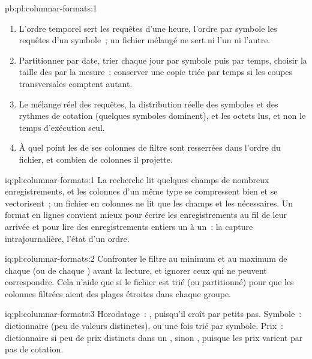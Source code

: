 \begin{solution}{pb:pl:columnar-formats:1}
\begin{enumerate}
davantage (0.64~Mo pour 2\,048 lignes, 6.00~Mo pour 524\,288 en ordre temporel).
\item L'ordre temporel sert les requêtes d'une heure, l'ordre par symbole les requêtes d'un symbole~; un fichier mélangé ne sert ni l'un ni l'autre.
\item Partitionner par date, trier chaque jour par symbole puis par temps, choisir la taille des  par la mesure~; conserver une copie triée par temps si
les coupes transversales comptent autant.
\item Le mélange réel des requêtes, la distribution réelle des symboles et des rythmes de cotation (quelques symboles dominent), et les octets lus, et non le
temps d'exécution seul.
\item À quel point les  de ses colonnes de filtre sont resserrées dans l'ordre du fichier, et combien de colonnes il projette.
\end{enumerate}
\end{solution}

\begin{solution}{iq:pl:columnar-formats:1}
La recherche lit quelques champs de nombreux enregistrements, et les colonnes d'un même type se compressent bien et se vectorisent~; un fichier en colonnes ne lit que les
champs et les  nécessaires. Un format en lignes convient mieux pour écrire les enregistrements au fil de leur arrivée et pour lire des enregistrements entiers
un à un~: la capture intrajournalière, l'état d'un ordre.
\end{solution}

\begin{solution}{iq:pl:columnar-formats:2}
Confronter le filtre au minimum et au maximum de chaque  (ou de chaque ) avant la lecture, et ignorer ceux qui ne peuvent
correspondre. Cela n'aide que si le fichier est trié (ou partitionné) pour que les colonnes filtrées aient des plages étroites dans chaque groupe.
\end{solution}

\begin{solution}{iq:pl:columnar-formats:3}
Horodatage~: , puisqu'il croît par petits pas. Symbole~: dictionnaire (peu de valeurs distinctes), ou  une fois trié
par symbole. Prix~: dictionnaire si peu de prix distincts dans un , sinon , puisque les prix varient par pas de cotation.
\end{solution}

